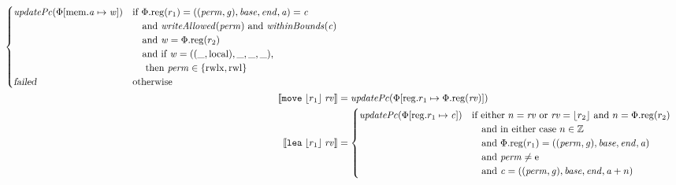 \documentclass[a4paper]{article}
\newcommand{\update}[2]{[#1 \mapsto #2]}
\newcommand{\sem}[1]{\left\llbracket #1 \right\rrbracket}
\newcommand{\var}[1]{\mathit{#1}}
\newcommand{\rv}{\var{rv}}
\newcommand{\gl}{\var{g}}
\newcommand{\addr}{\var{a}}
\newcommand{\start}{\var{base}}
\newcommand{\addrend}{\var{end}}
\newcommand{\perm}{\var{perm}}
\newcommand{\stdcap}[1][(\perm,\gl)]{\left(#1,\start,\addrend,\addr \right)}
\newcommand{\plainproj}[1]{\mathrm{#1}}
\newcommand{\memreg}[1][\Phi]{#1.\plainproj{reg}}
\newcommand{\updateHeap}[3][\Phi]{#1\update{\plainproj{mem}.#2}{#3}}
\newcommand{\updateReg}[3][\Phi]{#1\update{\plainproj{reg}.#2}{#3}}
\newcommand{\failed}{\textsl{failed}}
\newcommand{\plainfun}[2]{
  \ifthenelse{\equal{#2}{}}
  {\mathit{#1}}
  {\mathit{#1}(#2)}
}
\newcommand{\writeAllowed}[1]{\plainfun{writeAllowed}{#1}}
\newcommand{\withinBounds}[1]{\plainfun{withinBounds}{#1}}
\newcommand{\stdUpdatePc}[1]{\plainfun{updatePc}{#1}}
\newcommand{\ints}{\mathbb{Z}}
\newcommand{\refreg}[1]{\lfloor #1 \rfloor}
\newcommand{\zinstr}[1]{\mathtt{#1}}
\newcommand{\twoinstr}[3]{\zinstr{#1} \; #2 \; #3}
\newcommand{\move}[2]{\twoinstr{move}{#1}{#2}}
\newcommand{\lea}[2]{\twoinstr{lea}{#1}{#2}}
\newcommand{\plainperm}[1]{\mathrm{#1}}
\newcommand{\entry}{\plainperm{e}}
\newcommand{\readwritel}{\plainperm{rwl}}
\newcommand{\rwlx}{\plainperm{rwlx}}
\newcommand{\local}{\plainperm{local}}
\begin{document}
\begin{align*}
                                              \begin{cases}
                                                \stdUpdatePc{\updateHeap{\addr}{\var{w}}} &
                                                \arraycolsep=0pt
                                                \begin{array}[t]{l}
                                                  \text{if }\memreg(r_1) = \stdcap = \var{c} \\
                                                  \quad\text{and }\writeAllowed{\perm} \text{ and } \withinBounds{\var{c}} \\
                                                  \quad\text{and }\var{w} = \memreg(r_2)\\
                                                  \quad\text{and if } \var{w} = ((\_,\local),\_,\_,\_) \text{,} \\
                                                  \quad\text{ then } \perm \in \{\rwlx,\readwritel \}
                                                \end{array}\\
                                                \failed & \text{otherwise }
                                              \end{cases}\\
  \sem{\move{\refreg{r_1}}{\rv}}            & = \stdUpdatePc{\updateReg{r_1}{\memreg(\rv)}}
  \\
  \sem{\lea{\refreg{r_1}}{\rv}}            & =
                                             \begin{cases}
                                               \stdUpdatePc{\updateReg{r_1}{\var{c}}} &
                                               \arraycolsep=0pt
                                               \begin{array}[t]{l}
                                                 \text{if either $n = \rv$ or $\rv = \refreg{r_2}$ and $n = \memreg(r_2)$} \\
                                                 \quad\text{and in either case $n \in \ints $} \\
                                                 \quad\text{and $\memreg(r_1) = \stdcap$}\\
                                                 \quad\text{and $\perm \neq \entry$}\\
                                                 \quad\text{and $\var{c} = ((\perm,\gl),\start,\addrend,\addr + n)$}

\end{array}
\end{cases}
\end{align*}
\end{document}
